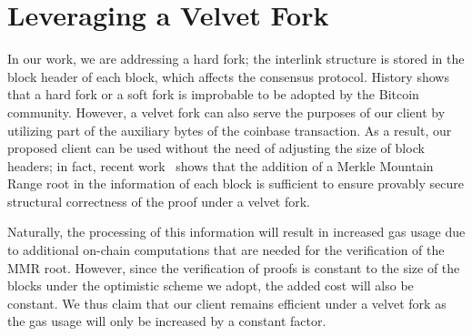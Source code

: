 \section{Leveraging a Velvet Fork}

In our work, we are addressing a hard fork; the interlink structure is stored
in the block header of each block, which affects the consensus protocol.
History shows that a hard fork or a soft fork is improbable to be adopted by
the Bitcoin community. However, a velvet fork can also serve the purposes of
our client by utilizing part of the auxiliary bytes of the coinbase
transaction. As a result, our proposed client can be used without the need of
adjusting the size of block headers; in fact, recent
work~\cite{velvet-nipopows} shows that the addition of a Merkle Mountain Range
root in the information of each block is sufficient to ensure provably secure
structural correctness of the proof under a velvet fork.

Naturally, the processing of this information will result in increased gas usage
due to additional on-chain computations that are needed for the verification of
the MMR root. However, since the verification of proofs is constant to the size
of the blocks under the optimistic scheme we adopt, the added cost will also be
constant. We thus claim that our client remains efficient under a velvet fork
as the gas usage will only be increased by a constant factor.
